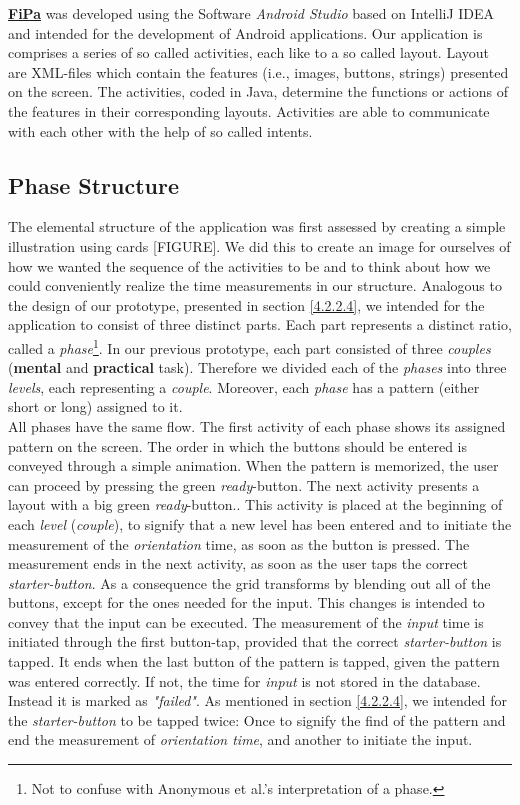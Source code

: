 \underline{\textbf{FiPa}} was developed using the Software \textit{Android Studio} based on IntelliJ IDEA and intended for the development of Android applications. Our application is comprises a series of so called activities, each like to a so called layout. Layout are XML-files which contain the features (i.e., images, buttons, strings) presented on the screen. The activities, coded in Java, determine the functions or actions of the features in their corresponding layouts. Activities are able to communicate with each other with the help of so called intents. 

\subsection{Phase Structure}

The elemental structure of the application was first assessed by creating a simple illustration using cards [FIGURE]. We did this to create an image for ourselves of how we wanted the sequence of the activities to be and to think about how we could conveniently realize the time measurements in our structure. Analogous to the design of our prototype, presented in section \ref{4.2.2.4}, we intended for the application to consist of three distinct parts. Each part represents a distinct ratio, called a \textit{phase}\footnote{Not to confuse with Anonymous et al.'s interpretation of a phase.}.
In our previous prototype, each part consisted of three \textit{couples} (\textbf{mental} and \textbf{practical} task). Therefore we divided each of the \textit{phases} into three \textit{levels}, each representing a \textit{couple}. Moreover, each \textit{phase} has a pattern (either short or long) assigned to it. \\

All phases have the same flow. The first activity of each phase shows its assigned pattern on the screen. The order in which the buttons should be entered is conveyed through a simple animation.  
When the pattern is memorized, the user can proceed by pressing the green \textit{ready}-button. The next activity presents a layout with a big green \textit{ready}-button.. This activity is placed at the beginning of each \textit{level} (\textit{couple}), to signify that a new level has been entered and to initiate the measurement of the \textit{orientation} time, as soon as the button is pressed. The measurement ends in the next activity, as soon as the user taps the correct \textit{starter-button}. As a consequence the grid transforms by blending out all of the buttons, except for the ones needed for the input. This changes is intended to convey that the input can be executed. The measurement of the \textit{input} time is initiated through the first button-tap, provided that the correct \textit{starter-button} is tapped. It ends when the last button of the pattern is tapped, given the pattern was entered correctly. If not, the time for \textit{input} is not stored in the database. Instead it is marked as \textit{"failed"}. As mentioned in section \ref{4.2.2.4}, we intended for the \textit{starter-button} to be tapped twice: Once to signify the find of the pattern and end the measurement of \textit{orientation time}, and another to initiate the input. 

